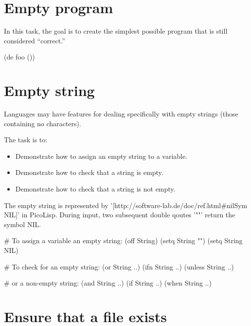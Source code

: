 \pagebreak{}
\section*{Empty program}

In this task, the goal is to create the simplest possible program that
is still considered ``correct.''

\begin{wideverbatim}

(de foo ())

\end{wideverbatim}

\pagebreak{}
\section*{Empty string}

Languages may have features for dealing specifically with empty strings
(those containing no characters).

The task is to:

\begin{itemize}
\item
  Demonstrate how to assign an empty string to a variable.
\end{itemize}

\begin{itemize}
\item
  Demonstrate how to check that a string is empty.
\item
  Demonstrate how to check that a string is not empty.
\end{itemize}


\begin{wideverbatim}

  The empty string is represented by
  '[http://software-lab.de/doc/ref.html#nilSym NIL]' in PicoLisp.
  During input, two subsequent double qoutes '""' return the symbol
  NIL.

# To assign a variable an empty string:
(off String)
(setq String "")
(setq String NIL)

# To check for an empty string:
(or String ..)
(ifn String ..)
(unless String ..)

# or a non-empty string:
(and String ..)
(if String ..)
(when String ..)

\end{wideverbatim}

\pagebreak{}
\section*{Ensure that a file exists}

